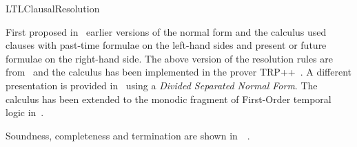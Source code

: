 \begin{entry}{LTLClausalResolution}
\begin{history}
First proposed in~\cite{Fis90-resolve} earlier versions of 
the normal form and the calculus used clauses with past-time formulae
on the left-hand sides and present or future formulae on the
right-hand side. The above version of the resolution rules are
from~\cite{FDP01} and the calculus has been implemented in the prover
TRP++~\cite{HustadtKonev2003a}. 
A different presentation is provided in~\cite{DFK02}
using a {\em Divided Separated Normal Form}.
The calculus has been extended to the monodic fragment of First-Order 
temporal logic in~\cite{DBLP:journals/tocl/DegtyarevFK06}.
\end{history}

\begin{technicalities}
Soundness, completeness and termination are shown in~~\cite{FDP01}.
\end{technicalities}



%
%
%
%
%
%
% 
%




\end{entry}
